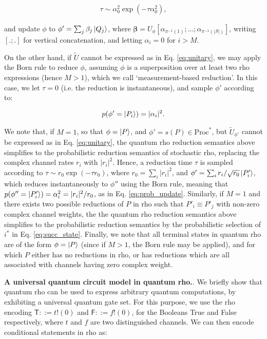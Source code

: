 \begin{eqnarray}
\tau \sim \alpha^2_0 \exp\left(-\tau\alpha^2_0\right),
\end{eqnarray}

\noindent and update $\phi$ to $\phi'=\sum_j \beta_j \ket{Q_j}$, where $\mathbf{\beta}=U_{\phi} [\alpha_{\pi^{-1}(1)} ; ... ; \alpha_{\pi^{-1}(|S|)}]$, writing $[.;.]$ for vertical concatenation, and letting $\alpha_i = 0$ for $i>M$.

On the other hand, if $\tilde{U}$ cannot be expressed as in Eq. \ref{eq:unitary}, we may apply the Born rule to reduce $\phi$, assuming $\phi$ is a superposition over at least two rho expressions (hence $M>1$), which we call `measurement-based reduction'.  In this case, we let $\tau=0$ (i.e. the reduction is instantaneous), and sample $\phi'$ according to:

\begin{eqnarray}
p(\phi'=\ket{P_i}) = |\alpha_i|^2.
\end{eqnarray}

We note that, if $M=1$, so that $\phi=\ket{P}$, and $\phi'=s(P)\in \text{Proc}^*$, but $\tilde{U}_{\phi'}$ cannot be expressed as in Eq. \ref{eq:unitary}, the quantum rho reduction semantics above simplifies to the probabilistic reduction semantics of stochastic rho, replacing the complex channel rates $r_i$ with $|r_i|^2$.  Hence, a reduction time $\tau$ is sampled according to $\tau \sim r_0\exp(-\tau r_0)$, where $r_0=\sum_i |r_i|^2$, and $\phi'=\sum_i r_i/\sqrt{r_0} \ket{P'_i}$, which reduces instantaneously to $\phi''$ using the Born rule, meaning that $p(\phi''=\ket{P_i'})=\alpha_i^2=|r_i|^2/r_0$, as in Eq. \ref{eq:prob_update}. Similarly, if $M=1$ and there exists two possible reductions of $P$ in rho such that $P'_i\equiv P'_j$ with non-zero complex channel weights, the the quantum rho reduction semantics above simplifies to the probabilistic reduction semantics by the probabilistic selection of $i^*$ in Eq. \ref{eq:succ_state}.  Finally, we note that all terminal states in quantum rho are of the form $\phi=\ket{P}$ (since if $M>1$, the Born rule may be applied), and for which $P$ either has no reductions in rho, or has reductions which are all associated with channels having zero complex weight. 

\vspace{0.5cm}
\noindent \textbf{A universal quantum circuit model in quantum rho.}. We briefly show that quantum rho can be used to express arbitrary quantum computations, by exhibiting a universal quantum gate set.  For this purpose, we use the rho encoding $\mathsf{T} ::= t\mathsf{!}(0)$ and $\mathsf{F} ::= f\mathsf{!}(0)$, for the Booleans True and False respectively, where $t$ and $f$ are two distinguished channels.  We can then encode conditional statements in rho as:

